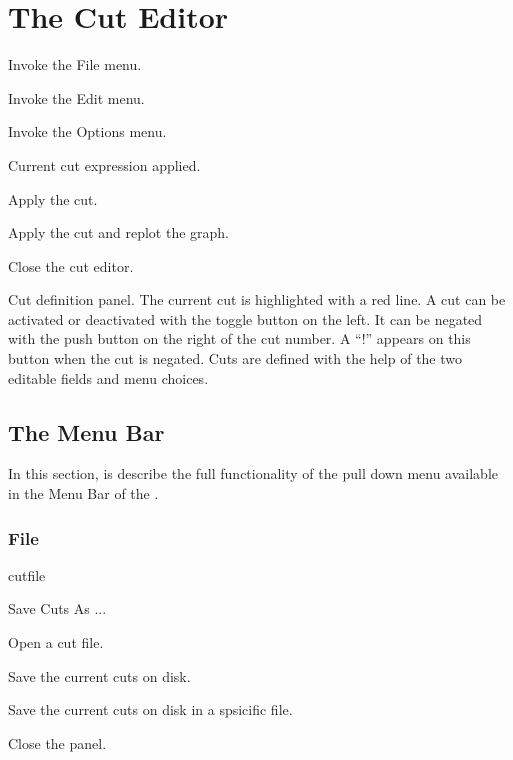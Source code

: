 \newpage

\section{The Cut Editor}


\begin{minipage}[t]{.32\linewidth}
\begin{EnumZW}
\item Invoke the File menu.
\item Invoke the Edit menu.
\item Invoke the Options menu.
\item Current cut expression applied.
\end{EnumZW}
\end{minipage}\hfill
\begin{minipage}[t]{.65\linewidth}
\begin{EnumZB}
\item Apply the cut.
\item Apply the cut and replot the graph.
\item Close the cut editor.
\item Cut definition panel. The current cut is highlighted with a red
  line. A cut can be activated or deactivated with the toggle button
  on the left. It can be negated with the push button on the right of
  the cut number. A ``!'' appears on this button when the cut is
  negated. Cuts are defined with the help of the two editable fields
  and menu choices.
\end{EnumZB}
\end{minipage}

\subsection{The \CE{} Menu Bar}
In this section, is describe the full functionality of the pull down
menu available in the Menu Bar of the \CE.

\subsubsection{File}

\begin{PAWf}[.16]{cutfile}
\begin{DLsf}{Save Cuts As ...}
\item[Open]             Open a cut file.
\item[Save Cuts]        Save the current cuts on disk.
\item[Save Cuts As ...] Save the current cuts on disk in a spsicific file.
\item[Close]            Close the panel.
\end{DLsf}
\end{PAWf}

